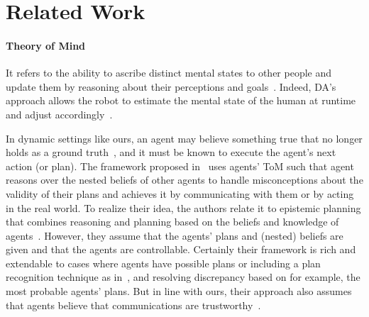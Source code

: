 \documentclass[letterpaper]{article} %
\begin{document}

\section{Related Work}
\paragraph{Theory of Mind }
It refers to the ability to ascribe distinct mental states to other people and update them by reasoning about their perceptions and goals~\cite{baron1985does}. 
Indeed, DA's approach allows the robot to estimate the mental state of the human at runtime and adjust accordingly~\cite{devin2016implemented}. 

In dynamic settings like ours, an agent may believe something true that no longer holds as a ground truth~\cite{DissingB20}, and it must be known to execute the agent's next action (or plan).
The framework proposed in~\cite{ShvoKM22} uses agents' ToM such that agent reasons over the nested beliefs of other agents to handle misconceptions about the validity of their plans and achieves it by communicating with them or by acting in the real world. To realize their idea, the authors relate it to epistemic planning that combines reasoning and planning based on the beliefs and knowledge of agents~\cite{petrick2002knowledge,BolanderA11}.
However, they assume that the agents' plans and (nested) beliefs are given and that the agents are controllable. Certainly their framework is rich and extendable to cases where agents have possible plans or including a plan recognition technique as in~\cite{CirilloKS09}, and resolving discrepancy based on for example, the most probable agents' plans.
But in line with ours, their approach also assumes that agents believe that communications are trustworthy~\cite{fabiano2021multi}.
\end{document}

